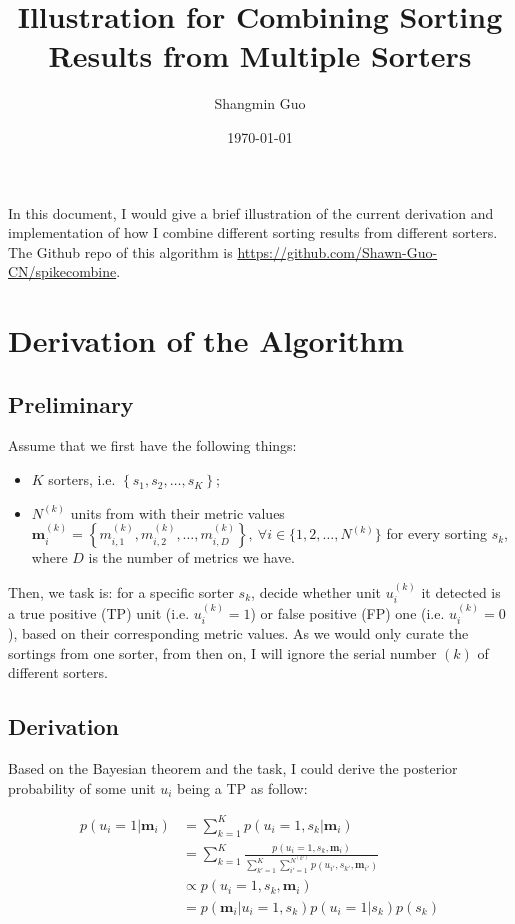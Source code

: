 \documentclass[12pt]{article}
\title{Illustration for Combining Sorting Results from Multiple Sorters}
\author{Shangmin Guo}
\date{\today}
\begin{document}
\maketitle

In this document, I would give a brief illustration of the current derivation and implementation of how I combine different sorting results from different sorters. The Github repo of this algorithm is \href{https://github.com/Shawn-Guo-CN/spikecombine}{https://github.com/Shawn-Guo-CN/spikecombine}.

\section{Derivation of the Algorithm}
\label{sec:derivation}

\subsection{Preliminary}
\label{ssec:preliminary}

Assume that we first have the following things:

\begin{itemize}
    \item $K$ sorters, i.e. $\left\{ s_1, s_2, \dots, s_K \right\}$;
    \item $N^{(k)}$ units from with their metric values 
    $\mathbf{m}^{(k)}_i=\left\{ m^{(k)}_{i,1}, m^{(k)}_{i,2}, \dots, m^{(k)}_{i,D} \right\},\ \forall i \in \{1, 2, \dots, N^{(k)}\}$
    for every sorting $s_k$, where $D$ is the number of metrics we have.
\end{itemize}

Then, we task is: for a specific sorter $s_k$, decide whether unit $u^{(k)}_i$ it detected is a true positive (TP) unit (i.e.  $u^{(k)}_i=1$) or false positive (FP) one (i.e. $u^{(k)}_i=0$), based on their corresponding metric values. As we would only curate the sortings from one sorter, from then on, I will ignore the serial number $(k)$ of different sorters.

\subsection{Derivation}
\label{ssec:derivation}

Based on the Bayesian theorem and the task, I could derive the posterior probability of some unit $u_i$ being a TP as follow:

\begin{equation}
    \begin{split}
        p(u_i=1|\mathbf{m}_i) 
            & = \sum_{k=1}^{K} p(u_i=1, s_k | \mathbf{m}_i) \\
            & = \sum_{k=1}^{K} \frac{p(u_i=1, s_k, \mathbf{m}_i)}{\sum_{k'=1}^{K}\sum_{i'=1}^{N^{(k')}}p(u_{i'}, s_{k'}, \mathbf{m}_{i'})} \\
            & \propto p(u_i=1, s_k, \mathbf{m}_i) \\
            & = p(\mathbf{m}_i | u_i=1, s_k) p(u_i=1|s_k) p(s_k)
    \end{split} \label{eq:postorior_prob_TP}
\end{equation}
\end{document}
